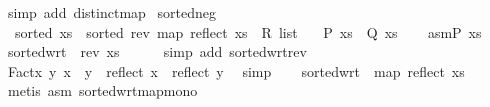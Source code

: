 \begin{isabellebody}
%
\isadelimproof
%
\endisadelimproof
%
\isatagproof
{}\isamarkupfalse%
\ {\isacharparenleft}{\kern0pt}simp\ add{\isacharcolon}{\kern0pt}\ distinct{\isacharunderscore}{\kern0pt}map{\isacharparenright}{\kern0pt}%
\endisatagproof
{\isafoldproof}%
%
\isadelimproof
\isanewline
%
\endisadelimproof
\isanewline
{}\isamarkupfalse%
\ sorted{\isacharunderscore}{\kern0pt}neg{\isacharcolon}{\kern0pt}\isanewline
\ \ {\isachardoublequoteopen}sorted\ xs\ {\isacharequal}{\kern0pt}\ sorted\ {\isacharparenleft}{\kern0pt}rev\ {\isacharparenleft}{\kern0pt}map\ reflect\ {\isacharparenleft}{\kern0pt}xs\ {\isacharcolon}{\kern0pt}{\isacharcolon}{\kern0pt}\ R{}\ list{\isacharparenright}{\kern0pt}{\isacharparenright}{\kern0pt}{\isacharparenright}{\kern0pt}{\isachardoublequoteclose}\isanewline
\ \ {\isacharparenleft}{\kern0pt}\ {\isachardoublequoteopen}{\isacharquery}{\kern0pt}P\ xs\ {\isacharequal}{\kern0pt}\ {\isacharquery}{\kern0pt}Q\ xs{\isachardoublequoteclose}{\isacharparenright}{\kern0pt}\isanewline
%
\isadelimproof
%
\endisadelimproof
%
\isatagproof
{}\isamarkupfalse%
\isanewline
\ \ \isamarkupfalse%
\ asm{\isacharcolon}{\kern0pt}{\isachardoublequoteopen}{\isacharquery}{\kern0pt}P\ xs{\isachardoublequoteclose}\isanewline
\ \ \isamarkupfalse%
\ {}{\isacharcolon}{\kern0pt}{\isachardoublequoteopen}sorted{\isacharunderscore}{\kern0pt}wrt\ {\isacharparenleft}{\kern0pt}{\isasymge}{\isacharparenright}{\kern0pt}\ {\isacharparenleft}{\kern0pt}rev\ xs{\isacharparenright}{\kern0pt}{\isachardoublequoteclose}\isanewline
\ \ \ \ \isamarkupfalse%
\ {\isacharparenleft}{\kern0pt}simp\ add{\isacharcolon}{\kern0pt}\ sorted{\isacharunderscore}{\kern0pt}wrt{\isacharunderscore}{\kern0pt}rev{\isacharparenright}{\kern0pt}\isanewline
\ \ \isamarkupfalse%
\ Fact{\isacharcolon}{\kern0pt}{\isachardoublequoteopen}{\isasymforall}x\ y{\isachardot}{\kern0pt}\ x\ {\isasymle}\ y\ {\isasymlongrightarrow}\ reflect\ x\ {\isasymge}\ reflect\ y{\isachardoublequoteclose}\ \isamarkupfalse%
\ simp\isanewline
\ \ \isamarkupfalse%
\ {}{\isacharcolon}{\kern0pt}{\isachardoublequoteopen}sorted{\isacharunderscore}{\kern0pt}wrt\ {\isacharparenleft}{\kern0pt}{\isasymge}{\isacharparenright}{\kern0pt}\ {\isacharparenleft}{\kern0pt}map\ reflect\ xs{\isacharparenright}{\kern0pt}{\isachardoublequoteclose}\isanewline
\ \ \ \ \isamarkupfalse%
\ {\isacharparenleft}{\kern0pt}metis\ asm\ sorted{\isacharunderscore}{\kern0pt}wrt{\isacharunderscore}{\kern0pt}map{\isacharunderscore}{\kern0pt}mono{\isacharparenright}{\kern0pt}\isanewline

\end{isabellebody}
